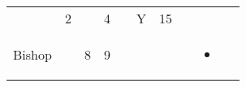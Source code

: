 \documentclass[12pt]{article}
\begin{document}
\begin{longtable}[]{@{}llllllllll@{}}
\begin{minipage}[t]{0.06\columnwidth}
\strut\end{minipage} &
\begin{minipage}[t]{0.06\columnwidth}\raggedright\strut
2
\strut\end{minipage} &
\begin{minipage}[t]{0.06\columnwidth}\raggedright\strut
\strut\end{minipage} &
\begin{minipage}[t]{0.06\columnwidth}\raggedright\strut
4
\strut\end{minipage} &
\begin{minipage}[t]{0.06\columnwidth}\raggedright\strut
\strut\end{minipage} &
\begin{minipage}[t]{0.07\columnwidth}\raggedright\strut
Y
\strut\end{minipage} &
\begin{minipage}[t]{0.08\columnwidth}\raggedright\strut
15
\strut\end{minipage}\tabularnewline
\begin{minipage}[t]{0.13\columnwidth}\raggedright\strut
Bishop
\strut\end{minipage} &
\begin{minipage}[t]{0.06\columnwidth}\raggedright\strut
\strut\end{minipage} &
\begin{minipage}[t]{0.06\columnwidth}\raggedright\strut
8
\strut\end{minipage} &
\begin{minipage}[t]{0.06\columnwidth}\raggedright\strut
9
\strut\end{minipage} &
\begin{minipage}[t]{0.06\columnwidth}\raggedright\strut
\strut\end{minipage} &
\begin{minipage}[t]{0.06\columnwidth}\raggedright\strut
\strut\end{minipage} &
\begin{minipage}[t]{0.06\columnwidth}\raggedright\strut
\strut\end{minipage} &
\begin{minipage}[t]{0.06\columnwidth}\raggedright\strut
\strut\end{minipage} &
\begin{minipage}[t]{0.07\columnwidth}\raggedright\strut
\begin{itemize}
\item
\end{itemize}
\strut\end{minipage} &

\end{longtable}
\end{document}
